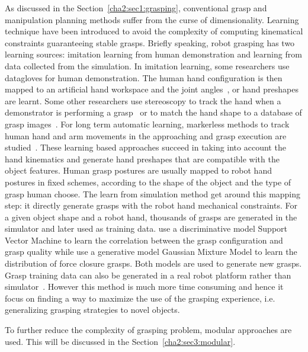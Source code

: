 As discussed in the Section~\ref{cha2:sec1:grasping}, conventional grasp and manipulation planning methods suffer from the curse of dimensionality.
Learning technique have been introduced to avoid the complexity of computing kinematical constraints guaranteeing stable grasps. Briefly speaking, robot grasping has two learning sources: imitation learning from human demonstration and learning from data collected from the simulation.
In imitation learning, some researchers use datagloves for human demonstration. The human hand configuration is then mapped to an artificial hand workspace and the joint angles~\citep{Fischer1998,ekvall2007learning}, or hand preshapes~\citep{Kyota2005, pelossof2004svm, Li07} are learnt. Some other researchers use stereoscopy to track the hand when a demonstrator is performing a grasp~\citep{hueser2006learning} or to match the hand shape to a database of grasp images~\citep{Romero2008}. For long term automatic learning, markerless methods to track human hand and arm movements in the approaching and grasp execution are studied~\citep{ekvall2007learning,do2009grasp}. These learning based approaches succeed in taking into account the hand kinematics and generate hand preshapes that are compatible with the object features. Human grasp postures are usually mapped to robot hand postures in fixed schemes, according to the shape of the object and the type of grasp human choose. The learn from simulation method get around this mapping step: it directly generate grasps with the robot hand mechanical constraints. For a given object shape and a robot hand, thousands of grasps are generated in the simulator and later used as training data. \citet{pelossof2004svm} use a discriminative model Support Vector Machine to learn the correlation between the grasp configuration and grasp quality while \citet{bidan2013grasp} use a generative model Gaussian Mixture Model to learn the distribution of force closure grasps. Both models are used to generate new grasps. Grasp training data can also be generated in a real robot platform rather than simulator~\citep{herzog2014learning}. However this method is much more time consuming and hence it focus on finding a way to maximize the use of the grasping experience, i.e. generalizing grasping strategies to novel objects.

To further reduce the complexity of grasping problem, modular approaches are used. This will be discussed in the Section~\ref{cha2:sec3:modular}.

